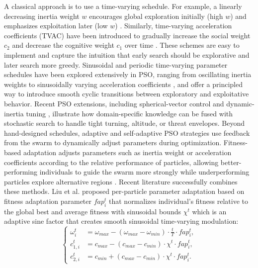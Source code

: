 \documentclass[fleqn,10pt]{wlscirep}
\begin{document}
A classical approach is to use a time-varying schedule.
For example, a linearly decreasing inertia weight \(w\) encourages global exploration initially (high \(w\)) and emphasizes exploitation later (low \(w\)) \cite{Eberhart2000parametercontrol}.
Similarly, time-varying acceleration coefficients (TVAC) have been introduced to gradually increase the social weight \(c_2\) and decrease the cognitive weight \(c_1\) over time \cite{ratnaweera2004tvac}.
These schemes are easy to implement and capture the intuition that early search should be explorative and later search more greedy.
Sinusoidal and periodic time-varying parameter schedules have been explored extensively in PSO, ranging from oscillating inertia weights \cite{kentzoglanakis2009oscillating} to sinusoidally varying acceleration coefficients \cite{chen2018sinusoidal}, and offer a principled way to introduce smooth cyclic transitions between exploratory and exploitative behavior.
Recent PSO extensions, including spherical-vector control \cite{manh2022sphericalpso} and dynamic-inertia tuning \cite{Bansal2011}, illustrate how domain-specific knowledge can be fused with stochastic search to handle tight turning, altitude, or threat envelopes.
Beyond hand-designed schedules, adaptive and self-adaptive PSO strategies use feedback from the swarm to dynamically adjust parameters during optimization.
Fitness-based adaptation adjusts parameters such as inertia weight or acceleration coefficients according to the relative performance of particles, allowing better-performing individuals to guide the swarm more strongly while underperforming particles explore alternative regions \cite{Li2017particle}.
Recent literature successfully combines these methods.
Liu et al. \cite{Liu2025spherical} proposed per-particle parameter adaptation based on fitness adaptation parameter $fap_i^{t}$ that normalizes individual's fitness relative to the global best and average fitness with sinusoidal bounds $\chi^{t}$ which is an adaptive sine factor that creates smooth sinusoidal time-varying modulation:
\begin{equation}
\left\{
\begin{aligned}
    \omega_i^{t}&=\omega_{max}-(\omega_{max}-\omega_{min})\cdot\frac{t}{T}\cdot fap_i^{t},\\
    c_{1,i}^{t}&=c_{max}-(c_{max}-c_{min})\cdot \chi^{t} \cdot fap_i^{t},\\
    c_{2,i}^{t}&=c_{min}+(c_{max}-c_{min})\cdot \chi^{t} \cdot fap_i^{t}.
\end{aligned}
\right.
\end{equation}
\end{document}
